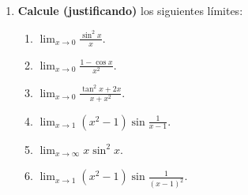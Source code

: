 \documentclass[12pt]{article}
\begin{document}
\begin{enumerate}
\begin{proof}
\begin{enumerate}
            \item $f$ no es continua en $]0,1[\cap\mathbb{Q}$. Sea $x_0\in]0,1[\cap\mathbb{Q}$, entonces existen $p,q\in\mathbb{N}$ primos relativos tales que $x_0=\frac{p}{q}$. Tomemos $\varepsilon=\frac{1}{q}>0$.
            
            Por la densidad de los racionales, para todo $\delta>0$ existe $x_\delta\in]0,1[\backslash\mathbb{Q}$ tal que
            \begin{equation*}
                \abs{x_0-x_\delta}<\delta
            \end{equation*}
            que cumple
            \begin{equation*}
                \abs{f(x_0)-f(x)}=\abs{\frac{1}{q}-0}=\frac{1}{q}\geq\varepsilon
            \end{equation*}
            Por tanto, $f$ no es continua en $x_0$.
        \end{enumerate}
        Por los dos incisos se sigue el resultado.
    \end{proof}

    \item \textbf{Calcule (justificando)} los siguientes límites:
    \begin{enumerate}
        \item $\lim_{x\rightarrow0}\frac{\sin^2x}{x}$.
        \item $\lim_{x\rightarrow0}\frac{1-\cos x}{x^2}$.
        \item $\lim_{x\rightarrow0}\frac{\tan^2x+2x}{x+x^2}$.
        \item $\lim_{x\rightarrow1}(x^2-1)\sin\frac{1}{x-1}$.
        \item $\lim_{x\rightarrow\infty}x\sin^2x$.
        \item $\lim_{x\rightarrow1}(x^2-1)\sin\frac{1}{(x-1)^2}$.
    \end{enumerate}


\end{enumerate}
\end{document}
